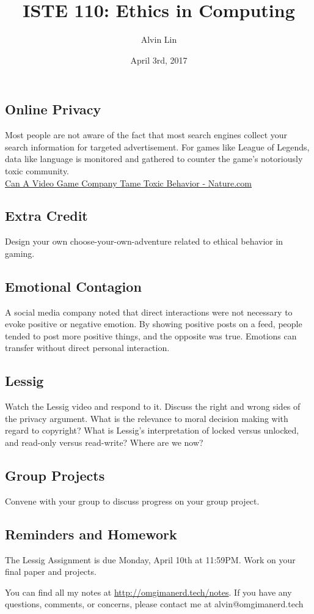 \documentclass[letterpaper, 12pt]{article}
\title{ISTE 110: Ethics in Computing}
\author{Alvin Lin}
\date{April 3rd, 2017}
\begin{document}
\maketitle

\subsection*{Online Privacy}
Most people are not aware of the fact that most search engines collect your
search information for targeted advertisement. For games like League of
Legends, data like language is monitored and gathered to counter the game's
notoriously toxic community. \\
\href{http://www.nature.com/news/can-a-video-game-company-tame-toxic-behaviour-1.19647}{Can A Video Game Company Tame Toxic Behavior - Nature.com}

\subsection*{Extra Credit}
Design your own choose-your-own-adventure related to ethical behavior in
gaming.

\subsection*{Emotional Contagion}
A social media company noted that direct interactions were not necessary to
evoke positive or negative emotion. By showing positive posts on a feed,
people tended to post more positive things, and the opposite was true.
Emotions can transfer without direct personal interaction.

\subsection*{Lessig}
Watch the Lessig video and respond to it. Discuss the right and wrong sides
of the privacy argument. What is the relevance to moral decision making with
regard to copyright? What is Lessig's interpretation of locked versus unlocked,
and read-only versus read-write? Where are we now?

\subsection*{Group Projects}
Convene with your group to discuss progress on your group project.

\subsection*{Reminders and Homework}
The Lessig Assignment is due Monday, April 10th at 11:59PM.
Work on your final paper and projects.

\begin{center}
  You can find all my notes at \url{http://omgimanerd.tech/notes}. If you have
  any questions, comments, or concerns, please contact me at
  alvin@omgimanerd.tech
\end{center}
\end{document}
